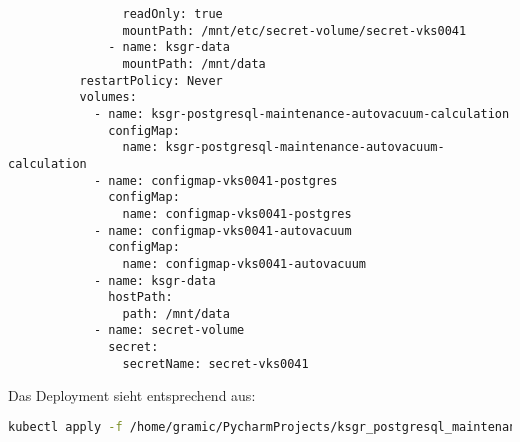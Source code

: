 \begin{flushleft}
\begin{lstlisting}
                readOnly: true
                mountPath: /mnt/etc/secret-volume/secret-vks0041
              - name: ksgr-data
                mountPath: /mnt/data
          restartPolicy: Never
          volumes:
            - name: ksgr-postgresql-maintenance-autovacuum-calculation
              configMap:
                name: ksgr-postgresql-maintenance-autovacuum-calculation
            - name: configmap-vks0041-postgres
              configMap:
                name: configmap-vks0041-postgres
            - name: configmap-vks0041-autovacuum
              configMap:
                name: configmap-vks0041-autovacuum
            - name: ksgr-data
              hostPath:
                path: /mnt/data
            - name: secret-volume
              secret:
                secretName: secret-vks0041
    \end{lstlisting}
    Das Deployment sieht entsprechend aus:
    \lstset{style=gra_codestyle}
    \begin{lstlisting}[language=bash, caption=Maintenance-Tool - \Gls{AUTOVACUUM} - ksgr-maintenance-autovacuum-caluclation Deploy,captionpos=b,label={lst:maintenannce-tool-autovacuum-ksgr-maintenance-autovacuum-caluclation-deploy},breaklines=true]
kubectl apply -f /home/gramic/PycharmProjects/ksgr_postgresql_maintenance/ksgr_postgresql_maintenance_autovacuum_calculation_cronjob.yaml
    \end{lstlisting}
\end{flushleft}